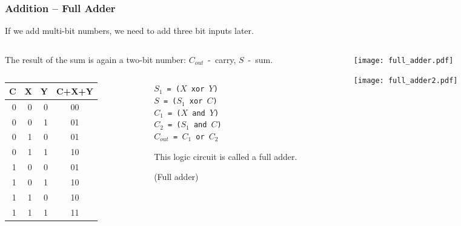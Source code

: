 \documentclass{beamer}
\begin{document}
\begin{frame}
\frametitle{Addition -- Full Adder}

If we add multi-bit numbers, we need to add three bit inputs later.

\begin{columns}
\begin{column}{0.6\textwidth}
The result of the sum is again a two-bit number: $C_{out}$~-~carry, $S$~-~sum.

\begin{columns}
\begin{column}{0.55\textwidth}

\bigskip

\begin{tabular}{|r|r|r|c|}\hline
C & X & Y & C+X+Y\\ \hline
0 & 0 & 0 & 00\\ \hline
0 & 0 & 1 & 01\\ \hline
0 & 1 & 0 & 01\\ \hline
0 & 1 & 1 & 10\\ \hline
1 & 0 & 0 & 01\\ \hline
1 & 0 & 1 & 10\\ \hline
1 & 1 & 0 & 10\\ \hline
1 & 1 & 1 & 11\\ \hline
\end{tabular}

\end{column}
\begin{column}{0.45\textwidth}

\texttt{$S_1$ = ($X$ xor $Y$)}\\
\texttt{$S$ = ($S_1$ xor $C$)}\\
\texttt{$C_1$ = ($X$ and $Y$)}\\
\texttt{$C_2$ = ($S_1$ and $C$)}\\
\texttt{$C_{out}$ = $C_1$ or $C_2$}

\bigskip

This logic circuit is called a full adder.

(Full adder)
\end{column}
\end{columns}

\end{column}
\begin{column}{0.4\textwidth}  

\begin{center}
   \texttt{[image: full\_adder.pdf]}
\end{center}


\begin{center}
   \texttt{[image: full\_adder2.pdf]}
\end{center}

\end{column}
\end{columns}


\end{frame}
\end{document}
